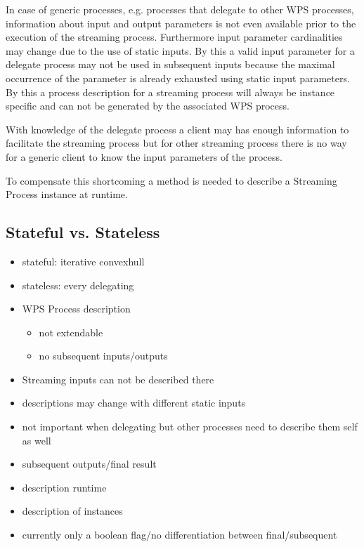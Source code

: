 		In case of generic processes, e.g. processes that delegate to other \ac{WPS} processes, information about input and output parameters is not even available prior to the execution of the streaming process. Furthermore input parameter cardinalities may change due to the use of static inputs. By this a valid input parameter for a delegate process may not be used in subsequent inputs because the maximal occurrence of the parameter is already exhausted using static input parameters. By this a process description for a streaming process will always be instance specific and can not be generated by the associated \ac{WPS} process.

		With knowledge of the delegate process a client may has enough information to facilitate the streaming process but for other streaming process there is no way for a generic client to know the input parameters of the process.

		To compensate this shortcoming a method is needed to describe a Streaming Process instance at runtime.
	\subsection{Stateful vs. Stateless}
	\begin{itemize}
		\item stateful: iterative convexhull
		\item stateless: every delegating
	\end{itemize}

	\begin{itemize}
		\item WPS Process description
		\begin{itemize}
			\item not extendable
			\item no subsequent inputs/outputs
		\end{itemize}
		\item Streaming inputs can not be described there
		\item descriptions may change with different static inputs
		\item not important when delegating but other processes need to describe them self as well
		\item subsequent outputs/final result
		\item description runtime
		\item description of instances
		\item currently only a boolean flag/no differentiation between final/subsequent
	\end{itemize}

